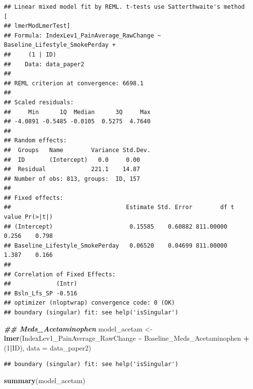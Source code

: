 \documentclass[
  12pt,
]{article}
\newenvironment{Shaded}{\begin{snugshade}}{\end{snugshade}}
\newcommand{\AttributeTok}[1]{\textcolor[rgb]{0.13,0.29,0.53}{#1}}
\newcommand{\DecValTok}[1]{\textcolor[rgb]{0.00,0.00,0.81}{#1}}
\newcommand{\DocumentationTok}[1]{\textcolor[rgb]{0.56,0.35,0.01}{\textbf{\textit{#1}}}}
\newcommand{\FunctionTok}[1]{\textcolor[rgb]{0.13,0.29,0.53}{\textbf{#1}}}
\newcommand{\NormalTok}[1]{#1}
\newcommand{\OtherTok}[1]{\textcolor[rgb]{0.56,0.35,0.01}{#1}}
\newcommand{\SpecialCharTok}[1]{\textcolor[rgb]{0.81,0.36,0.00}{\textbf{#1}}}
\begin{document}
\begin{verbatim}
## Linear mixed model fit by REML. t-tests use Satterthwaite's method [
## lmerModLmerTest]
## Formula: IndexLev1_PainAverage_RawChange ~ Baseline_Lifestyle_SmokePerday +  
##     (1 | ID)
##    Data: data_paper2
## 
## REML criterion at convergence: 6698.1
## 
## Scaled residuals: 
##     Min      1Q  Median      3Q     Max 
## -4.0891 -0.5485 -0.0105  0.5275  4.7640 
## 
## Random effects:
##  Groups   Name        Variance Std.Dev.
##  ID       (Intercept)   0.0     0.00   
##  Residual             221.1    14.87   
## Number of obs: 813, groups:  ID, 157
## 
## Fixed effects:
##                                 Estimate Std. Error        df t value Pr(>|t|)
## (Intercept)                      0.15585    0.60882 811.00000   0.256    0.798
## Baseline_Lifestyle_SmokePerday   0.06520    0.04699 811.00000   1.387    0.166
## 
## Correlation of Fixed Effects:
##             (Intr)
## Bsln_Lfs_SP -0.516
## optimizer (nloptwrap) convergence code: 0 (OK)
## boundary (singular) fit: see help('isSingular')
\end{verbatim}

\begin{Shaded}
\begin{Highlighting}[]
\DocumentationTok{\#\# Meds\_Acetaminophen}
\NormalTok{model\_acetam }\OtherTok{\textless{}{-}} \FunctionTok{lmer}\NormalTok{(IndexLev1\_PainAverage\_RawChange }\SpecialCharTok{\textasciitilde{}}\NormalTok{ Baseline\_Meds\_Acetaminophen }\SpecialCharTok{+}\NormalTok{ (}\DecValTok{1}\SpecialCharTok{|}\NormalTok{ID), }\AttributeTok{data =}\NormalTok{ data\_paper2)}
\end{Highlighting}
\end{Shaded}

\begin{verbatim}
## boundary (singular) fit: see help('isSingular')
\end{verbatim}

\begin{Shaded}
\begin{Highlighting}[]
\FunctionTok{summary}\NormalTok{(model\_acetam)}
\end{Highlighting}
\end{Shaded}
\end{document}
